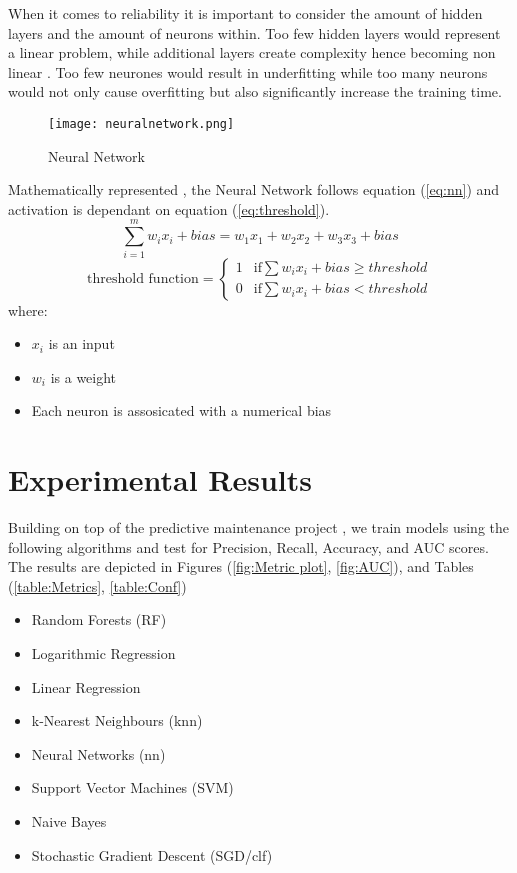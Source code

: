 When it comes to reliability it is important to consider the amount of hidden layers and the amount of neurons within.
Too few hidden layers would represent a linear problem, while additional layers create complexity hence becoming non linear \cite{4618341}.
Too few neurones would result in underfitting while too many neurons would not only cause overfitting but also significantly increase the training time.

\begin{figure}[h]
    \texttt{[image: neuralnetwork.png]}
    \centering
    \caption{Neural Network \cite{IBM-nn}}
    \label{fig:NN}
\end{figure}

\enlargethispage{-2\baselineskip}
Mathematically represented \cite{IBM-nn}, the Neural Network follows equation (\ref{eq:nn}) and activation is dependant on equation (\ref{eq:threshold}).
\begin{equation}
    \label{eq:nn}
    \sum^m_{i=1} w_ix_i + bias = w_1x_1 + w_2x_2 + w_3x_3 + bias
\end{equation}
\begin{equation}
    \label{eq:threshold}
    \text{threshold function} = \begin{cases}
        1 & \text{if} \sum w_ix_i + bias \geq threshold\\
        0 & \text{if} \sum w_ix_i + bias < threshold
    \end{cases}
\end{equation}
where:
\begin{itemize}
    \item $x_i$ is an input
    \item $w_i$ is a weight
    \item Each neuron is assosicated with a numerical bias
\end{itemize}

\section{Experimental Results}
Building on top of the predictive maintenance project \cite{ahonen}, we train models using the following algorithms and test for Precision, Recall, Accuracy, and AUC scores.
The results are depicted in Figures (\ref{fig:Metric plot}, \ref{fig:AUC}), and Tables (\ref{table:Metrics}, \ref{table:Conf})
\begin{itemize}
    \item Random Forests (RF)
    \item Logarithmic Regression
    \item Linear Regression
    \item k-Nearest Neighbours (knn)
    \item Neural Networks (nn)
    \item Support Vector Machines (SVM)
    \item Naive Bayes
    \item Stochastic Gradient Descent (SGD/clf)
\end{itemize}

